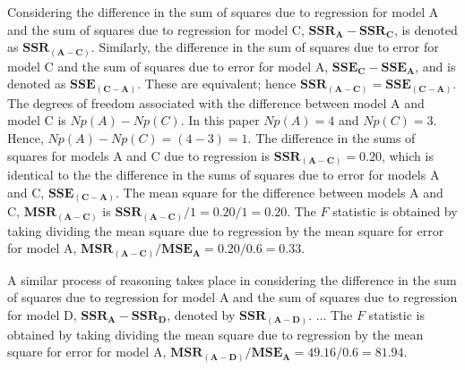 \documentclass[11pt, oneside]{article}   	%
\begin{document}
\vspace{2 mm}

Considering the difference in the sum of squares due to regression for model A and the sum of squares due to regression for model C, $  \mathbf{SSR_{A}} -  \mathbf{SSR_{C}} $, is denoted as $  \mathbf{SSR_{(A-C)}}  $.  Similarly, the difference in the sum of squares due to error for model C and the sum of squares due to error for model A, $  \mathbf{SSE_{C}} -  \mathbf{SSE_{A}}   $, and is denoted as $ \mathbf{ SSE_{(C-A)}}   $. These are equivalent; hence $   \mathbf{SSR_{(A-C)}}  =  \mathbf{ SSE_{(C-A)}}   $.  The degrees of freedom associated with the difference between model A and model C is $  Np(A) - Np(C)  $.  In this paper  $  Np(A) = 4 $ and $  Np(C) = 3  $.  Hence,  $  Np(A) - Np(C)   =  (4 - 3) =  1$.  The difference in the sums of squares for models A and C due to regression is $ \mathbf{SSR_{(A-C)}}  = 0.20 $, which is identical to the the difference in the sums of squares due to error for models A and C, $  \mathbf{SSE_{(C-A)}} $. The mean square for the difference between models A and C, $ \mathbf{MSR_{(A-C)}}  $ is $ \mathbf{SSR_{(A-C)}} / 1 = 0.20/1 = 0.20 $.  The $ F  $ statistic is obtained by taking dividing the mean square due to regression by the mean square for error for model A, $ \mathbf{MSR_{(A-C)}} / \mathbf{MSE_{A}} = 0.20 / 0.6 = 0.33 $.   

\vspace{2 mm}

A similar process of reasoning takes place in considering the difference in the sum of squares due to regression for model A and the sum of squares due to regression for model D, $  \mathbf{SSR_{A}} -  \mathbf{SSR_{D}} $, denoted by $  \mathbf{SSR_{(A-D)}}  $. ... The $ F  $ statistic is obtained by taking dividing the mean square due to regression by the mean square for error for model A, $ \mathbf{MSR_{(A-D)}} / \mathbf{MSE_{A}} = 49.16/ 0.6 = 81.94 $.  
   

\vspace{2 mm}
\end{document}
